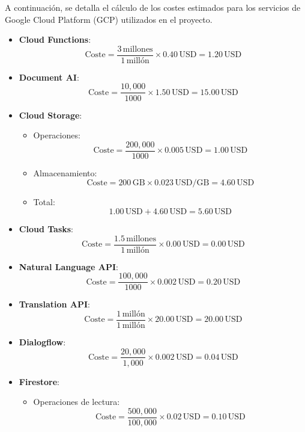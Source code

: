 \begin{enumerate}
\begin{enumerate}
				A continuación, se detalla el cálculo de los costes estimados para los servicios
				de Google Cloud Platform (GCP) utilizados en el proyecto.

				\begin{itemize}
					\item \textbf{Cloud Functions}:
						\[
							\text{Coste}= \frac{3 \, \text{millones}}{1 \, \text{millón}}\times
							0.40 \, \text{USD}= 1.20 \, \text{USD}
						\]

					\item \textbf{Document AI}:
						\[
							\text{Coste}= \frac{10,000}{1000}\times 1.50 \, \text{USD}= 15.00 \,
							\text{USD}
						\]

					\item \textbf{Cloud Storage}:
						\begin{itemize}
							\item Operaciones:
								\[
									\text{Coste}= \frac{200,000}{1000}\times 0.005 \, \text{USD}= 1
									.00 \, \text{USD}
								\]

							\item Almacenamiento:
								\[
									\text{Coste}= 200 \, \text{GB}\times 0.023 \, \text{USD/GB}= 4.
									60 \, \text{USD}
								\]

							\item Total:
								\[
									1.00 \, \text{USD}+ 4.60 \, \text{USD}= 5.60 \, \text{USD}
								\]
						\end{itemize}

					\item \textbf{Cloud Tasks}:
						\[
							\text{Coste}= \frac{1.5 \, \text{millones}}{1 \, \text{millón}}\times
							0.00 \, \text{USD}= 0.00 \, \text{USD}
						\]

					\item \textbf{Natural Language API}:
						\[
							\text{Coste}= \frac{100,000}{1000}\times 0.002 \, \text{USD}= 0.20
							\, \text{USD}
						\]

					\item \textbf{Translation API}:
						\[
							\text{Coste}= \frac{1 \, \text{millón}}{1 \, \text{millón}}\times 2
							0.00 \, \text{USD}= 20.00 \, \text{USD}
						\]

					\item \textbf{Dialogflow}:
						\[
							\text{Coste}= \frac{20,000}{1,000}\times 0.002 \, \text{USD}= 0.04
							\, \text{USD}
						\]

					\item \textbf{Firestore}:
						\begin{itemize}
							\item Operaciones de lectura:
								\[
									\text{Coste}= \frac{500,000}{100,000}\times 0.02 \, \text{USD}=
									0.10 \, \text{USD}
								\]


\end{itemize}
\end{itemize}
\end{enumerate}
\end{enumerate}
